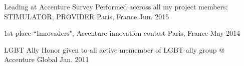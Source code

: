 
\begin{cvhonors}

  \cvhonor
    {Leading at Accenture} %
    {Survey Performed accross all my project members: STIMULATOR, PROVIDER} %
    {Paris, France} %
    {Jun. 2015} %

  \cvhonor
    {1st place} %
    {``Innovaders", Accenture innovation contest} %
    {Paris, France} %
    {May 2014} %

  \cvhonor
    {LGBT Ally} %
    {Honor given to all active memember of LGBT ally group @ Accenture} %
    {Global} %
    {Jan. 2011} %

\end{cvhonors}
